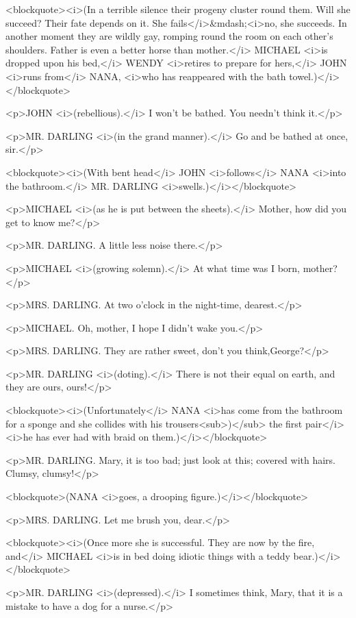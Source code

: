 <blockquote><i>(In a terrible silence their progeny cluster round
them. Will she succeed? Their fate depends on it. She
fails</i>&mdash;<i>no, she succeeds. In another moment they are
wildly gay, romping round the room on each other's shoulders. Father
is even a better horse than mother.</i> MICHAEL <i>is dropped upon
his bed,</i> WENDY <i>retires to prepare for hers,</i> JOHN <i>runs
from</i> NANA, <i>who has reappeared with the bath
towel.)</i></blockquote>

<p>JOHN <i>(rebellious).</i> I won't be bathed. You needn't think
it.</p>

<p>MR. DARLING <i>(in the grand manner).</i> Go and be bathed at
once, sir.</p>

<blockquote><i>(With bent head</i> JOHN <i>follows</i> NANA <i>into
the bathroom.</i> MR. DARLING <i>swells.)</i></blockquote>

<p>MICHAEL <i>(as he is put between the sheets).</i> Mother, how did
you get to know me?</p>

<p>MR. DARLING. A little less noise there.</p>

<p>MICHAEL <i>(growing solemn).</i> At what time was I born,
mother?</p>

<p>MRS. DARLING. At two o'clock in the night-time, dearest.</p>

<p>MICHAEL. Oh, mother, I hope I didn't wake you.</p>

<p>MRS. DARLING. They are rather sweet, don't you think,George?</p>

<p>MR. DARLING <i>(doting).</i> There is not their equal on earth,
and they are ours, ours!</p>

<blockquote><i>(Unfortunately</i> NANA <i>has come from the bathroom
for a sponge and she collides with his trousers<sub>)</sub> the first
pair</i> <i>he has ever had with braid on them.)</i></blockquote>

<p>MR. DARLING. Mary, it is too bad; just look at this; covered with
hairs. Clumsy, clumsy!</p>

<blockquote>(NANA <i>goes, a drooping figure.)</i></blockquote>

<p>MRS. DARLING. Let me brush you, dear.</p>

<blockquote><i>(Once more she is successful. They are now by the
fire, and</i> MICHAEL <i>is in bed doing idiotic things with a teddy
bear.)</i></blockquote>

<p>MR. DARLING <i>(depressed).</i> I sometimes think, Mary, that it
is a mistake to have a dog for a nurse.</p>

